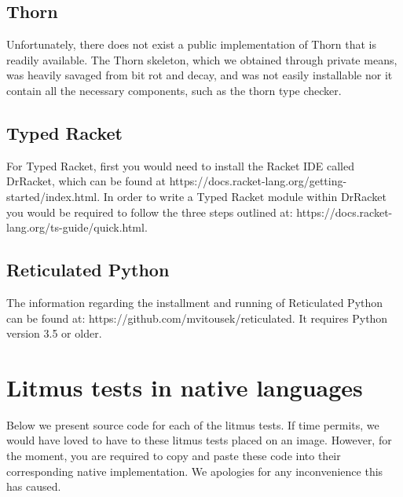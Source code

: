 \documentclass[]{article}
\begin{document}
\subsection{Thorn}

Unfortunately, there does not exist a public implementation of Thorn that is readily available. The Thorn skeleton, which we obtained through private means, was heavily savaged from bit rot and decay, and was not easily installable nor it contain all the necessary components, such as the thorn type checker.

\subsection{Typed Racket}

For Typed Racket, first you would need to install the Racket IDE called DrRacket, which can be found at https://docs.racket-lang.org/getting-started/index.html. In order to write a Typed Racket module within DrRacket you would be required to follow the three steps outlined at: https://docs.racket-lang.org/ts-guide/quick.html.


\subsection{Reticulated Python}

The information regarding the installment and running of Reticulated Python can be found at: https://github.com/mvitousek/reticulated. It requires Python version 3.5 or older. 


\section{Litmus tests in native languages}

Below we present source code for each of the litmus tests. If time permits, we would have loved to have to these litmus tests placed on an image. However, for the moment, you are required to copy and paste these code into their corresponding native implementation. We apologies for any inconvenience this has caused. 
\end{document}
